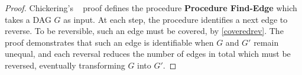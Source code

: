 \begin{proof}
Chickering's ~\cite{chickering} proof defines the procedure \textbf{Procedure Find-Edge} which takes a DAG $G$ as input. At each step, the procedure identifies a next edge to reverse. To be reversible, such an edge must be covered, by \cref{coveredrev}. The proof demonstrates that such an edge is identifiable when $G$ and $G'$ remain unequal, and each reversal reduces the number of edges in total which must be reversed, eventually transforming $G$ into $G'$. 
\end{proof}










%
%
%
%
%
%


